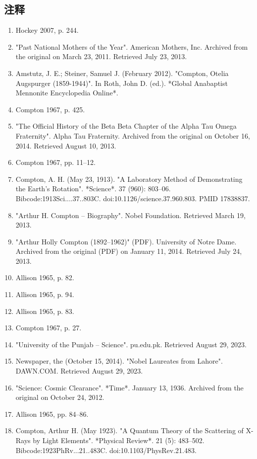 \subsection{注释}
\begin{enumerate}
\item Hockey 2007, p. 244.
\item "Past National Mothers of the Year". American Mothers, Inc. Archived from the original on March 23, 2011. Retrieved July 23, 2013.
\item Amstutz, J. E.; Steiner, Samuel J. (February 2012). "Compton, Otelia Augspurger (1859-1944)". In Roth, John D. (ed.). *Global Anabaptist Mennonite Encyclopedia Online*.
\item Compton 1967, p. 425.
\item "The Official History of the Beta Beta Chapter of the Alpha Tau Omega Fraternity". Alpha Tau Fraternity. Archived from the original on October 16, 2014. Retrieved August 10, 2013.
\item Compton 1967, pp. 11–12.
\item Compton, A. H. (May 23, 1913). "A Laboratory Method of Demonstrating the Earth's Rotation". *Science*. 37 (960): 803–06. Bibcode:1913Sci....37..803C. doi:10.1126/science.37.960.803. PMID 17838837.
\item "Arthur H. Compton – Biography". Nobel Foundation. Retrieved March 19, 2013.
\item "Arthur Holly Compton (1892–1962)" (PDF). University of Notre Dame. Archived from the original (PDF) on January 11, 2014. Retrieved July 24, 2013.
\item Allison 1965, p. 82.
\item Allison 1965, p. 94.
\item Allison 1965, p. 83.
\item Compton 1967, p. 27.
\item "University of the Punjab – Science". pu.edu.pk. Retrieved August 29, 2023.
\item Newspaper, the (October 15, 2014). "Nobel Laureates from Lahore". DAWN.COM. Retrieved August 29, 2023.
\item "Science: Cosmic Clearance". *Time*. January 13, 1936. Archived from the original on October 24, 2012.
\item Allison 1965, pp. 84–86.
\item Compton, Arthur H. (May 1923). "A Quantum Theory of the Scattering of X-Rays by Light Elements". *Physical Review*. 21 (5): 483–502. Bibcode:1923PhRv...21..483C. doi:10.1103/PhysRev.21.483.

\end{enumerate}
